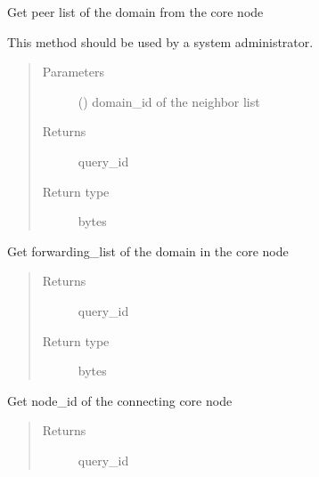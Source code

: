 \documentclass[letterpaper,10pt,english]{sphinxmanual}
\begin{document}
\begin{fulllineitems}
\begin{fulllineitems}
\label{\detokenize{bbc1.core.bbc_app:bbc1.core.bbc_app.BBcAppClient.get_domain_neighborlist}}
Get peer list of the domain from the core node

This method should be used by a system administrator.
\begin{quote}\begin{description}
\item[{Parameters}] \leavevmode
{} () \textendash{} domain\_id of the neighbor list

\item[{Returns}] \leavevmode
query\_id

\item[{Return type}] \leavevmode
bytes

\end{description}\end{quote}

\end{fulllineitems}


\begin{fulllineitems}
\label{\detokenize{bbc1.core.bbc_app:bbc1.core.bbc_app.BBcAppClient.get_forwarding_list}}
Get forwarding\_list of the domain in the core node
\begin{quote}\begin{description}
\item[{Returns}] \leavevmode
query\_id

\item[{Return type}] \leavevmode
bytes

\end{description}\end{quote}

\end{fulllineitems}


\begin{fulllineitems}
\label{\detokenize{bbc1.core.bbc_app:bbc1.core.bbc_app.BBcAppClient.get_node_id}}
Get node\_id of the connecting core node
\begin{quote}\begin{description}
\item[{Returns}] \leavevmode
query\_id


\end{description}
\end{quote}
\end{fulllineitems}
\end{fulllineitems}
\end{document}
